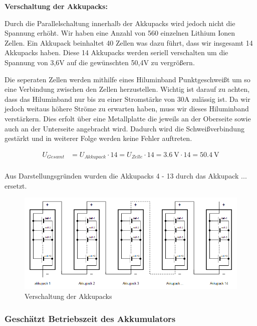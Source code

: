 \textbf{Verschaltung der Akkupacks:}

Durch die Parallelschaltung innerhalb der Akkupacks wird jedoch nicht die Spannung erhöht. Wir haben eine Anzahl von 560 einzelnen Lithium Ionen Zellen. Ein Akkupack beinhaltet 40 Zellen was dazu führt, dass wir insgesamt 14 Akkupacks haben. Diese 14 Akkupacks werden seriell verschalten um die Spannung von 3,6V auf die gewünschten 50,4V zu vergrößern.

Die seperaten Zellen werden mithilfe eines Hiluminband Punktgeschweißt um so eine Verbindung zwischen den Zellen herzustellen.
Wichtig ist darauf zu achten, dass das Hiluminband nur bis zu einer Stromstärke von 30A zulässig ist. Da wir jedoch weitaus höhere Ströme zu erwarten haben, muss wir dieses Hiluminband verstärkern. Dies erfolt über eine Metallplatte die jeweils an der Oberseite sowie auch an der Unterseite angebracht wird. Dadurch wird die Schweißverbindung gestärkt und in weiterer Folge werden keine Fehler auftreten. 

\begin{align*}
U_{Gesamt} &= U_{Akkupack} \cdot 14= U_{Zelle} \cdot 14= 3.6~\mathrm{V} \cdot 14 = 50.4~\mathrm{V}\\
\end{align*}

Aus Darstellungsgründen wurden die Akkupacks 4 - 13 durch das  Akkupack ... ersetzt.

\begin{figure}[H]
	\begin{center}
		\includegraphics[scale=0.9]{figures/Akku/VerschaltungderAkkupacks.PNG}
		\caption{Verschaltung der Akkupacks}
	\end{center}
\end{figure}
\newpage
\subsubsection{Geschätzt Betriebszeit des Akkumulators}

